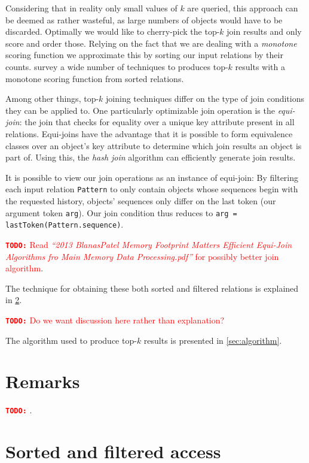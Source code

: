 \documentclass[11pt,a4paper]{report}
\newcommand{\inlinecode}[1]{\lstinline[columns=fixed]{#1}}
\newcommand{\todo}[1]{\textcolor{red}{{\footnotesize\textbf{\texttt{TODO:}}} #1}}
\begin{document}
Considering that in reality only small values of $k$ are queried, this approach
can be deemed as rather wasteful, as large numbers of objects would have to be
discarded.
Optimally we would like to cherry-pick the top-$k$ join results and only
score and order those.
Relying on the fact that we are dealing with a \emph{monotone} scoring function
we approximate this by sorting our input relations by their counts.
\cite{Ilyas2008} survey a wide number of techniques to produces top-$k$ results
with a monotone scoring function from sorted relations.

Among other things, top-$k$ joining techniques differ on the type of join
conditions they can be applied to.
One particularly optimizable join operation is the \emph{equi-join}:
the join that checks for equality over a unique key attribute present in all
relations.
Equi-joins have the advantage that it is possible to form equivalence classes
over an object's key attribute to determine which join results an object is
part of.
Using this, the \emph{hash join} algorithm can efficiently generate join
results.

It is possible to view our join operations as an instance of equi-join:
By filtering each input relation \inlinecode{Pattern} to only contain
objects whose sequences begin with the requested history, objects'
sequences only differ on the last token (our argument token \inlinecode{arg}).
Our join condition thus reduces to
\inlinecode{arg = lastToken(Pattern.sequence)}.

\todo{Read \textit{``2013 BlanasPatel Memory Footprint Matters Efficient
Equi-Join Algorithms fro Main Memory Data Processing.pdf''} for possibly better
join algorithm}.

The technique for obtaining these both sorted and filtered relations is
explained in \cref{sec:sorted-and-filtered-access}.

\todo{Do we want discussion here rather than explanation?}

The algorithm used to produce top-$k$ results is presented in
\cref{sec:algorithm}.

\section{Remarks}

\todo{}.

\section{Sorted and filtered access}
\label{sec:sorted-and-filtered-access}
\end{document}
